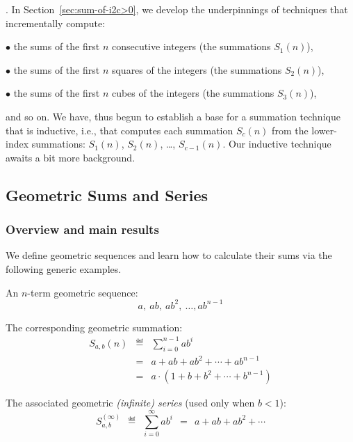 \bigskip

.
In Section~\ref{sec:sum-of-i2c>0}, we develop the underpinnings of
techniques that incrementally compute:

$\bullet$ the sums of the first $n$ consecutive integers (the summations $S_1(n)$), 

$\bullet$ the sums of the first $n$ squares of the integers (the summations $S_2(n)$), 

$\bullet$ the sums of the first $n$ cubes of the integers (the summations $S_3(n)$),

\noindent
and so on.  We have, thus begun to establish a base for a summation technique that is inductive, i.e., that computes each summation
$S_c(n)$ from the lower-index summations: $S_1(n)$, $S_2(n)$, \ldots, $S_{c-1}(n)$.  Our inductive technique awaits a bit more background.


\subsection{Geometric Sums and Series}
\label{sec:general-geometric-series}
\label{sec:geometric-sums}
\label{sec:general-geometric-sums}

\subsubsection{Overview and main results}

We define geometric sequences and learn how to calculate their sums
via the following generic examples.

An $n$-term geometric sequence:
\begin{equation}
\label{eq:genl-geom-seq}
a, \ ab, \ ab^2, \ \ldots, ab^{n-1}
\end{equation}

The corresponding geometric summation:
\begin{eqnarray}
\label{eq:genl-geom-summation}
S_{a,b}(n)
 & \eqdef &  \sum_{i=0}^{n-1} a b^i \\
\nonumber
 & = &  a + ab + ab^2 + \cdots + ab^{n-1} \\
\nonumber
 & = & 
 a \cdot (1+ b + b^2 + \cdots + b^{n-1})
\end{eqnarray}

The associated geometric {\em (infinite) series} (used only when $b < 1$):
\begin{equation}
\label{eq:genl-geom-series}
S_{a,b}^{(\infty)} \ \ \eqdef \ \  \sum_{i=0}^\infty a b^i
 \ \  = \ \   a + ab + ab^2 + \cdots 
\end{equation}

